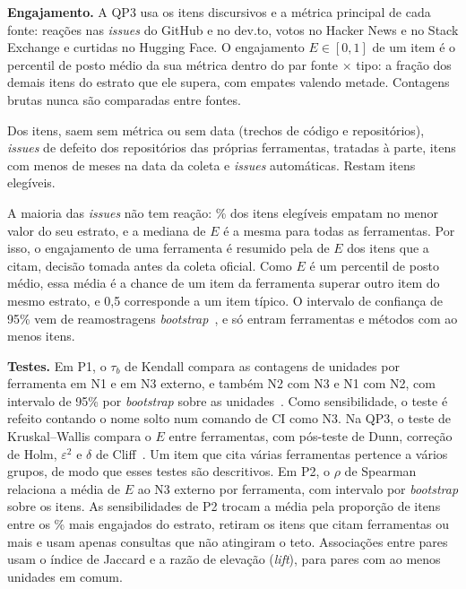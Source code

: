 \documentclass[sigconf]{acmart}
\newif\ifcomstatsmodels
\begin{document}
\textbf{Engajamento.} A QP3 usa os itens discursivos e a métrica principal de cada fonte: reações nas \textit{issues} do GitHub e no dev.to, votos no Hacker News e no Stack Exchange e curtidas no Hugging Face. O engajamento $E \in [0,1]$ de um item é o percentil de posto médio da sua métrica dentro do par fonte $\times$ tipo: a fração dos demais itens do estrato que ele supera, com empates valendo metade. Contagens brutas nunca são comparadas entre fontes.

Dos \ResItens{} itens, saem \ResEngExclSemMetrica{} sem métrica ou sem data (trechos de código e repositórios), \ResEngExclDor{} \textit{issues} de defeito dos repositórios das próprias ferramentas, tratadas à parte, \ResEngExclIdade{} itens com menos de \ResMinIdade{} meses na data da coleta e \ResEngExclBot{} \textit{issues} automáticas. Restam \ResEngItens{} itens elegíveis.

A maioria das \textit{issues} não tem reação: \ResEngPctPiso\% dos itens elegíveis empatam no menor valor do seu estrato, e a mediana de $E$ é a mesma para todas as ferramentas. Por isso, o engajamento de uma ferramenta é resumido pela \ResEngEstatistica{} de $E$ dos itens que a citam, decisão tomada antes da coleta oficial. Como $E$ é um percentil de posto médio, essa média é a chance de um item da ferramenta superar outro item do mesmo estrato, e 0,5 corresponde a um item típico. O intervalo de confiança de 95\% vem de \ResBoot{} reamostragens \textit{bootstrap}~\cite{efron1993bootstrap}, e só entram ferramentas e métodos com ao menos \ResMinN{} itens.

\textbf{Testes.} Em P1, o $\tau_b$ de Kendall compara as contagens de unidades por ferramenta em N1 e em N3 externo, e também N2 com N3 e N1 com N2, com intervalo de 95\% por \textit{bootstrap} sobre as unidades~\cite{kendall1938,efron1993bootstrap}. Como sensibilidade, o teste é refeito contando o nome solto num comando de CI como N3. Na QP3, o teste de Kruskal--Wallis compara o $E$ entre ferramentas, com pós-teste de Dunn, correção de Holm, $\varepsilon^2$ e $\delta$ de Cliff~\cite{kruskal1952,dunn1964,holm1979,cliff1993dominance}. Um item que cita várias ferramentas pertence a vários grupos, de modo que esses testes são descritivos. Em P2, o $\rho$ de Spearman relaciona a média de $E$ ao N3 externo por ferramenta, com intervalo por \textit{bootstrap} sobre os itens. As sensibilidades de P2 trocam a média pela proporção de itens entre os \ResTopoPct\% mais engajados do estrato, retiram os itens que citam \ResListicle{} ferramentas ou mais e usam apenas consultas que não atingiram o teto. Associações entre pares usam o índice de Jaccard e a razão de elevação (\textit{lift}), para pares com ao menos \ResMinPar{} unidades em comum.\ifcomstatsmodels{} Como robustez, uma regressão binomial negativa das contagens brutas, com efeitos fixos de ferramenta e de fonte $\times$ tipo, ordena as ferramentas pelo efeito estimado, e P3 usa um modelo linear de $E$ com idade e estrato como controles.\fi
\end{document}
